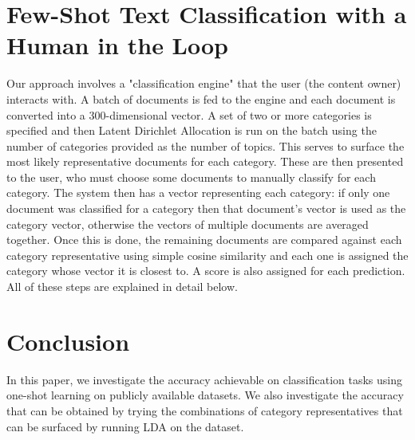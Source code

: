 \documentclass[11pt,letterpaper]{article}
\begin{document}
\section{Few-Shot Text Classification with a Human in the Loop}
Our approach involves a "classification engine" that the user (the content owner) interacts with. A batch of documents is fed to the engine and each document is converted into a 300-dimensional vector. A set of two or more categories is specified and then Latent Dirichlet Allocation is run on the batch using the number of categories provided as the number of topics. This serves to surface the most likely representative documents for each category. These are then presented to the user, who must choose some documents to manually classify for each category. The system then has a vector representing each category: if only one document was classified for a category then that document's vector is used as the category vector, otherwise the vectors of multiple documents are averaged together. Once this is done, the remaining documents are compared against each category representative using simple cosine similarity and each one is assigned the category whose vector it is closest to. A score is also assigned for each prediction. All of these steps are explained in detail below.









\section{Conclusion}

In this paper, we investigate the accuracy achievable on classification tasks using one-shot learning on publicly available datasets. We also investigate the accuracy that can be obtained by trying the combinations of category representatives that can be surfaced by running LDA on the dataset.



\end{document}
